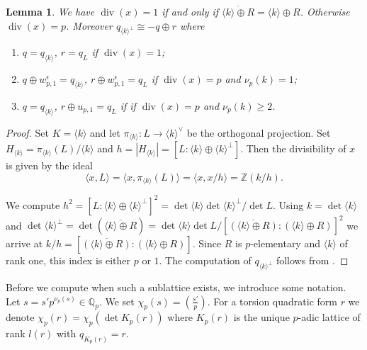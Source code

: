 \documentclass{amsart}
\theoremstyle{definition}
\theoremstyle{plain}
\newtheorem{lemma}[definition]{Lemma}
\newcommand{\QQ}{\mathbb{Q}}
\newcommand{\ZZ}{\mathbb{Z}}
\newcommand{\leg}[2]{\left( \frac{#1}{#2}\right)}
\renewcommand{\div}{\mathop{div}}
\begin{document}
\begin{lemma}\label{lem:qc-decomp}
We have $\div(x)=1$ if and only if $\overline{\langle k \rangle \oplus R}=\langle k \rangle \oplus R$.
Otherwise $\div(x)=p$. Moreover
$q_{\langle k \rangle^\perp} \cong -q \oplus r$ where
\begin{enumerate}
 \item $q=q_{\langle k \rangle }$, $r = q_L$ if $\div(x) =1$;
 \item $q\oplus w_{p,1}^\epsilon=q_{\langle k \rangle }$, $r\oplus w_{p,1}^\epsilon = q_L$ if $\div(x) =p$ and $\nu_p(k) =1$;
 \item $q=q_{\langle k \rangle }$, $r \oplus u_{p,1} = q_L$ if if $\div(x) =p$ and $\nu_p(k) \geq 2$.
\end{enumerate}

\end{lemma}
\begin{proof}
 Set $K=\langle k \rangle$ and let $\pi_{\langle k \rangle}\colon L \rightarrow {\langle k \rangle}^\vee$
 be the orthogonal projection.
 Set $H_{\langle k \rangle} = \pi_{\langle k \rangle}(L)/{\langle k \rangle}$ and $h=|H_{\langle k \rangle}|= [L:{\langle k \rangle}\oplus {\langle k \rangle}^\perp]$.
 Then the divisibility of $x$ is given by the ideal
 \[\langle x, L \rangle=\langle x,\pi_{\langle k \rangle}(L) \rangle=
 \langle  x,x/h\rangle=\ZZ (k/h).\]
 
 We compute $h^2=[L:{\langle k \rangle}\oplus {\langle k \rangle}^\perp]^2 = \det {\langle k \rangle} \det {\langle k \rangle}^\perp/\det L
 $.
 Using $k =\det {\langle k \rangle}$ and $\det {\langle k \rangle}^\perp=\det \left(\overline{{\langle k \rangle}\oplus R}\right)
 = \det {\langle k \rangle} \det L /\left[\overline{({\langle k \rangle} \oplus R)}:({\langle k \rangle} \oplus R)\right]^2$
 we arrive at $k/h = \left[\overline{({\langle k \rangle} \oplus R)}:({\langle k \rangle} \oplus R)\right]$.
Since $R$ is $p$-elementary and ${\langle k \rangle}$ of rank one, this index is either $p$ or $1$.
The computation of $q_{{\langle k \rangle}^\perp}$ follows from .
\end{proof}

Before we compute when such a sublattice exists, we introduce some notation.
Let $s=s'p^{\nu_p(s)} \in \QQ_p$. We set $\chi_p(s)=\leg{s'}{p}$. For a torsion quadratic form $r$ we denote $\chi_p(r) = \chi_p(\det K_p(r))$ where $K_p(r)$ is the unique $p$-adic lattice of rank $l(r)$ with $q_{K_p(r)}=r$.
\end{document}
